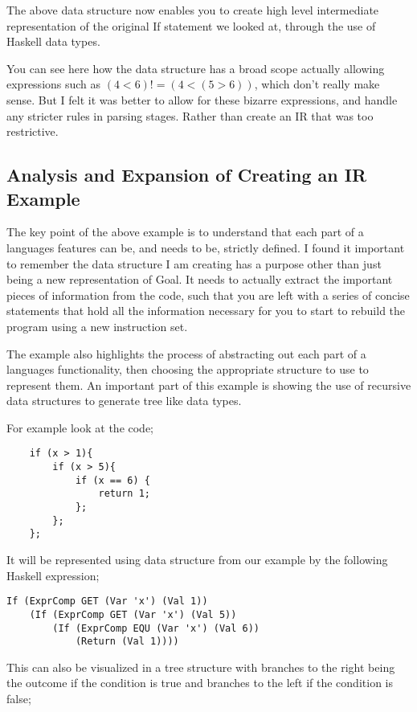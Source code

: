 The above data structure now enables you to create high level intermediate representation of the original If statement we looked at, through the use of Haskell data types. 

You can see here how the data structure has a broad scope actually allowing expressions such as $(4<6) != (4 < (5>6))$, which don't really make sense. But I felt it was better to allow for these bizarre expressions, and handle any stricter rules in parsing stages. Rather than create an IR that was too restrictive.

\subsection{Analysis and Expansion of Creating an IR Example}

The key point of the above example is to understand that each part of a languages features can be, and needs to be, strictly defined. I found it important to remember the data structure I am creating  has a purpose other than just being a new representation of Goal. It needs to actually extract the important pieces of information from the code, such that you are left with a series of concise statements that hold all the information necessary for you to start to rebuild the program using a new instruction set.

The example also highlights the process of abstracting out each part of a languages functionality, then choosing the appropriate structure to use to represent them. An important part of this example is showing the use of recursive data structures to generate tree like data types.

For example look at the code;

\begin{lstlisting}
	if (x > 1){
		if (x > 5){
		 	if (x == 6) {
		 		return 1;
		 	};	
		};
	};
\end{lstlisting}  
 
It will be represented using data structure from our example by the following Haskell expression;

\begin{lstlisting}
If (ExprComp GET (Var 'x') (Val 1)) 
	(If (ExprComp GET (Var 'x') (Val 5))
		(If (ExprComp EQU (Var 'x') (Val 6))
			(Return (Val 1)))) 
\end{lstlisting} 

This can also be visualized in a tree structure with branches to the right being the outcome if the condition is true and branches to the left if the condition is false;

